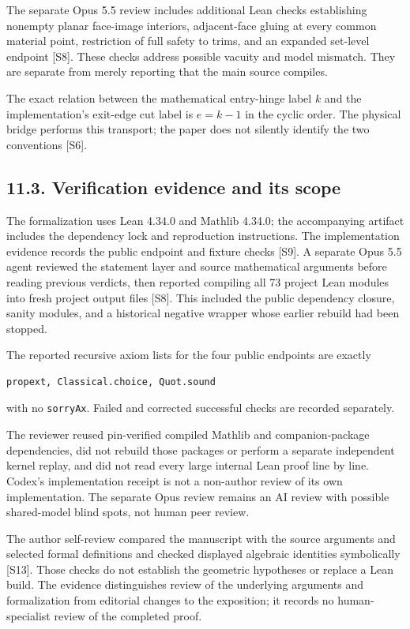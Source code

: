 \documentclass[
  11pt,
  letterpaper,
]{article}
\begin{document}
The separate Opus 5.5 review includes additional Lean checks
establishing nonempty planar face-image interiors, adjacent-face gluing
at every common material point, restriction of full safety to trims, and
an expanded set-level endpoint {[}S8{]}. These checks address possible
vacuity and model mismatch. They are separate from merely reporting that
the main source compiles.

The exact relation between the mathematical entry-hinge label \(k\) and
the implementation's exit-edge cut label is \(e=k-1\) in the cyclic
order. The physical bridge performs this transport; the paper does not
silently identify the two conventions {[}S6{]}.

\subsection{11.3. Verification evidence and its
scope}\label{verification-evidence-and-its-scope}

The formalization uses Lean 4.34.0 and Mathlib 4.34.0; the accompanying
artifact includes the dependency lock and reproduction instructions. The
implementation evidence records the public endpoint and fixture checks
{[}S9{]}. A separate Opus 5.5 agent reviewed the statement layer and
source mathematical arguments before reading previous verdicts, then
reported compiling all 73 project Lean modules into fresh project output
files {[}S8{]}. This included the public dependency closure, sanity
modules, and a historical negative wrapper whose earlier rebuild had
been stopped.

The reported recursive axiom lists for the four public endpoints are
exactly

\begin{verbatim}
propext, Classical.choice, Quot.sound
\end{verbatim}

with no \texttt{sorryAx}. Failed and corrected successful checks are
recorded separately.

The reviewer reused pin-verified compiled Mathlib and companion-package
dependencies, did not rebuild those packages or perform a separate
independent kernel replay, and did not read every large internal Lean
proof line by line. Codex's implementation receipt is not a non-author
review of its own implementation. The separate Opus review remains an AI
review with possible shared-model blind spots, not human peer review.

The author self-review compared the manuscript with the source arguments
and selected formal definitions and checked displayed algebraic
identities symbolically {[}S13{]}. Those checks do not establish the
geometric hypotheses or replace a Lean build. The evidence distinguishes
review of the underlying arguments and formalization from editorial
changes to the exposition; it records no human-specialist review of the
completed proof.
\end{document}
